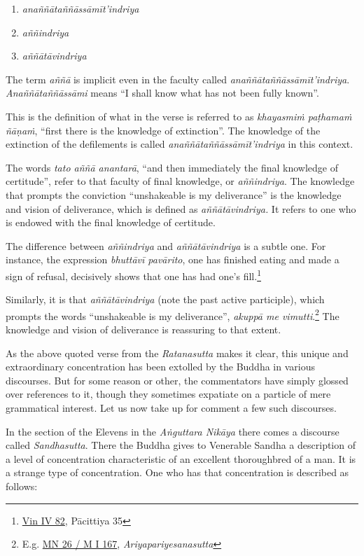 \begin{enumerate}
\def\labelenumi{\arabic{enumi}.}
\tightlist
\item
  \emph{anaññātaññāssāmīt'indriya}
\item
  \emph{aññindriya}
\item
  \emph{aññātāvindriya}
\end{enumerate}

The term \emph{aññā} is implicit even in the faculty called \emph{anaññātaññāssāmīt'indriya}. \emph{Anaññātaññāssāmi} means ``I shall know what has not been fully known''.

This is the definition of what in the verse is referred to as \emph{khayasmiṁ paṭhamaṁ ñāṇaṁ}, ``first there is the knowledge of extinction''. The knowledge of the extinction of the defilements is called \emph{anaññātaññāssāmīt'indriya} in this context.

The words \emph{tato aññā anantarā}, ``and then immediately the final knowledge of certitude'', refer to that faculty of final knowledge, or \emph{aññindriya}. The knowledge that prompts the conviction ``unshakeable is my deliverance'' is the knowledge and vision of deliverance, which is defined as \emph{aññātāvindriya.} It refers to one who is endowed with the final knowledge of certitude.

The difference between \emph{aññindriya} and \emph{aññātāvindriya} is a subtle one. For instance, the expression \emph{bhuttāvī pavārito}, one has finished eating and made a sign of refusal, decisively shows that one has had one's fill.\footnote{\href{https://suttacentral.net/pli-tv-bu-vb-pc35/pli/ms}{Vin IV 82}, Pācittiya 35}

Similarly, it is that \emph{aññātāvindriya} (note the past active participle), which prompts the words ``unshakeable is my deliverance'', \emph{akuppā me vimutti}.\footnote{E.g. \href{https://suttacentral.net/mn26/pli/ms}{MN 26 / M I 167}, \emph{Ariyapariyesanasutta}} The knowledge and vision of deliverance is reassuring to that extent.

As the above quoted verse from the \emph{Ratanasutta} makes it clear, this unique and extraordinary concentration has been extolled by the Buddha in various discourses. But for some reason or other, the commentators have simply glossed over references to it, though they sometimes expatiate on a particle of mere grammatical interest. Let us now take up for comment a few such discourses.

In the section of the Elevens in the \emph{Aṅguttara Nikāya} there comes a discourse called \emph{Sandhasutta}. There the Buddha gives to Venerable Sandha a description of a level of concentration characteristic of an excellent thoroughbred of a man. It is a strange type of concentration. One who has that concentration is described as follows:

